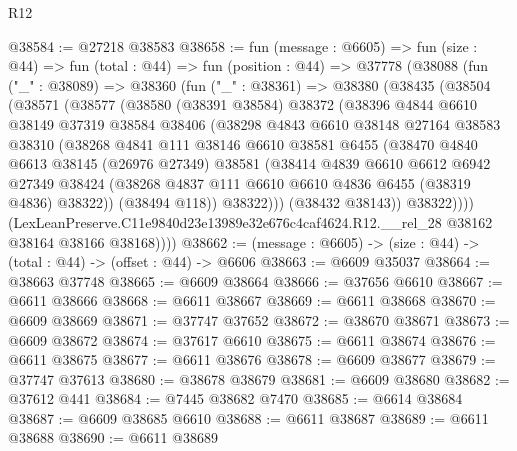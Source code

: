 \begin{lexlean}{R12}
\begin{coremodule}
@38584 := @27218 @38583
@38658 := fun (message : @6605) =>
  fun (size : @44) =>
  fun (total : @44) =>
  fun (position : @44) =>
  @37778
    (@38088
      (fun ("_" : @38089) =>
      @38360
        (fun ("_" : @38361) =>
        @38380
          (@38435
            (@38504
              (@38571
                (@38577
                  (@38580
                    (@38391 @38584)
                    @38372
                    (@38396
                      @4844
                      @6610
                      @38149
                      @37319
                      @38584
                      @38406
                      (@38298
                        @4843
                        @6610
                        @38148
                        @27164
                        @38583
                        @38310
                        (@38268
                          @4841
                          @111
                          @38146
                          @6610
                          @38581
                          @6455
                          (@38470
                            @4840
                            @6613
                            @38145
                            (@26976 @27349)
                            @38581
                            (@38414
                              @4839
                              @6610
                              @6612
                              @6942
                              @27349
                              @38424
                              (@38268 @4837 @111 @6610 @6610 @4836 @6455 (@38319 @4836) @38322))
                            (@38494 @118))
                          @38322)))
                    (@38432 @38143))
                  @38322))))
          (LexLeanPreserve.C11e9840d23e13989e32e676c4caf4624.R12.__rel_28
            @38162
            @38164
            @38166
            @38168))))
@38662 := (message : @6605) -> (size : @44) -> (total : @44) -> (offset : @44) -> @6606
@38663 := @6609 @35037
@38664 := @38663 @37748
@38665 := @6609 @38664
@38666 := @37656 @6610
@38667 := @6611 @38666
@38668 := @6611 @38667
@38669 := @6611 @38668
@38670 := @6609 @38669
@38671 := @37747 @37652
@38672 := @38670 @38671
@38673 := @6609 @38672
@38674 := @37617 @6610
@38675 := @6611 @38674
@38676 := @6611 @38675
@38677 := @6611 @38676
@38678 := @6609 @38677
@38679 := @37747 @37613
@38680 := @38678 @38679
@38681 := @6609 @38680
@38682 := @37612 @441
@38684 := @7445 @38682 @7470
@38685 := @6614 @38684
@38687 := @6609 @38685 @6610
@38688 := @6611 @38687
@38689 := @6611 @38688
@38690 := @6611 @38689

\end{coremodule}
\end{lexlean}
